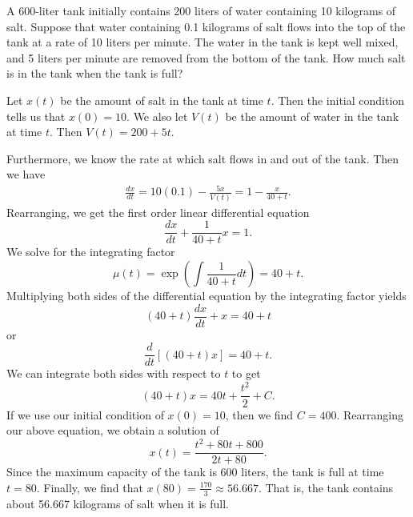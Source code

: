 \documentclass[11pt]{article}
\begin{document}
  \pagebreak

  \begin{problem}[Problem 1.5.21]
    A 600-liter tank initially contains 200 liters of water containing 10 kilograms of salt.
    Suppose that water containing 0.1 kilograms of salt flows into the top of the tank at a rate of 10 liters per minute.
    The water in the tank is kept well mixed, and 5 liters per minute are removed from the bottom of the tank.
    How much salt is in the tank when the tank is full?
  \end{problem}

  \begin{solution}
    Let \(x(t)\) be the amount of salt in the tank at time \(t\).
    Then the initial condition tells us that \(x(0) = 10\).
    We also let \(V(t)\) be the amount of water in the tank at time \(t\).
    Then \(V(t) = 200 + 5t\).

    Furthermore, we know the rate at which salt flows in and out of the tank.
    Then we have
    \begin{gather*}
      \frac{dx}{dt} = 10 (0.1) - \frac{5x}{V(t)} = 1 - \frac{x}{40 + t}.
    \end{gather*}
    Rearranging, we get the first order linear differential equation
    \begin{equation*}
      \frac{dx}{dt} + \frac{1}{40 + t} x = 1.
    \end{equation*}
    We solve for the integrating factor
    \begin{equation*}
      \mu(t) = \exp \left( \int \frac{1}{40 + t} dt \right) = 40 + t.
    \end{equation*}
    Multiplying both sides of the differential equation by the integrating factor yields
    \begin{equation*}
      (40 + t) \frac{dx}{dt} + x = 40 + t
    \end{equation*}
    or
    \begin{equation*}
      \frac{d}{dt}\left[ (40 + t) x \right] = 40 + t.
    \end{equation*}
    We can integrate both sides with respect to \(t\) to get
    \begin{equation*}
      (40 + t) x = 40t + \frac{t^{2}}{2} + C.
    \end{equation*}
    If we use our initial condition of \(x(0) = 10\), then we find \(C = 400\).
    Rearranging our above equation, we obtain a solution of
    \begin{equation*}
      x(t) = \frac{t^{2}  + 80t + 800}{2t + 80}.
    \end{equation*}
    Since the maximum capacity of the tank is 600 liters, the tank is full at time \(t = 80\).
    Finally, we find that \(x(80) = \frac{170}{3} \approx 56.667\).
    That is, the tank contains about 56.667 kilograms of salt when it is full.
  \end{solution}
\end{document}
